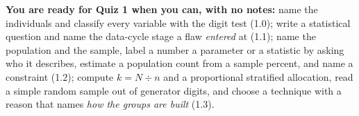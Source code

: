 \documentclass[10pt]{article}
\begin{document}
\begin{enumerate}[leftmargin=2.2em, itemsep=9pt, topsep=2pt]
\end{enumerate}
\normalsize

\vspace{6pt}
\boxguard[12]
\begin{remindbox}
\small
\textbf{You are ready for Quiz 1 when you can, with no notes:}
name the individuals and classify every variable with the digit test (1.0);
write a statistical question and name the data-cycle stage a flaw \emph{entered} at (1.1);
name the population and the sample, label a number a parameter or a statistic by asking who it
describes, estimate a population count from a sample percent, and name a constraint (1.2);
compute $k = N \div n$ and a proportional stratified allocation, read a simple random sample
out of generator digits, and choose a technique with a reason that names \emph{how the groups
are built} (1.3).
\end{remindbox}
\end{document}
